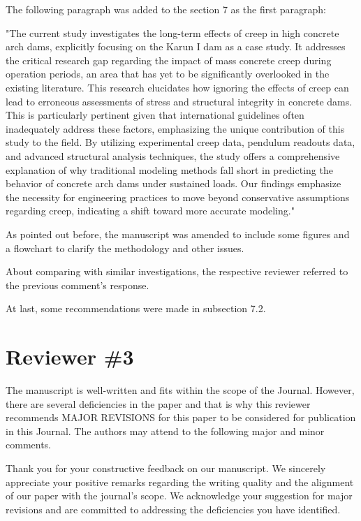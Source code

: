 \documentclass{ar2rc}
\begin{document}
{	\AR The following paragraph was added to the section 7 as the first paragraph: 
	
	"The current study investigates the long-term effects of creep in high concrete arch dams, explicitly focusing on the Karun I dam as a case study. It addresses the critical research gap regarding the impact of mass concrete creep during operation periods, an area that has yet to be significantly overlooked in the existing literature. This research elucidates how ignoring the effects of creep can lead to erroneous assessments of stress and structural integrity in concrete dams. This is particularly pertinent given that international guidelines often inadequately address these factors, emphasizing the unique contribution of this study to the field. By utilizing experimental creep data, pendulum readouts data, and advanced structural analysis techniques, the study offers a comprehensive explanation of why traditional modeling methods fall short in predicting the behavior of concrete arch dams under sustained loads. Our findings emphasize the necessity for engineering practices to move beyond conservative assumptions regarding creep, indicating a shift toward more accurate modeling."
	
	As pointed out before, the manuscript was amended to include some figures and a flowchart to clarify the methodology and other issues.
	
	About comparing with similar investigations, the respective reviewer referred to the previous comment's response.
	
	At last, some recommendations were made in subsection 7.2. 
	
	
	\newpage
	\section{Reviewer \#3}
	\RC The manuscript is well-written and fits within the scope of the Journal. However, there are several deficiencies in the paper and that is why this reviewer recommends MAJOR REVISIONS for this paper to be considered for publication in this Journal. The authors may attend to the following major and minor comments.
	
	\AR Thank you for your constructive feedback on our manuscript. We sincerely appreciate your positive remarks regarding the writing quality and the alignment of our paper with the journal's scope. We acknowledge your suggestion for major revisions and are committed to addressing the deficiencies you have identified.
	
}
\end{document}
